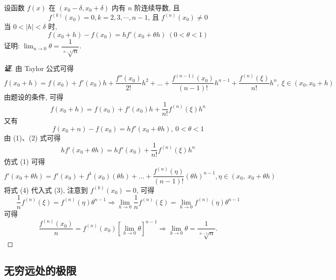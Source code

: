 \begin{example}
    设函数 $f(x)$ 在 $(x_0-\delta,x_0+\delta)$ 内有 $n$ 阶连续导数, 且
    $$f^{(k)}(x_0)=0,k=2,3,\cdots,n-1\text{, 且 }f^{(n)}(x_0)\neq 0$$
    当 $0<|h|<\delta$ 时, 
    $$f(x_0+h)  -f(x_0)  =hf'(x_{0}+\theta h)  ~ ( 0 <\theta  < 1) $$
    证明: $\displaystyle \lim _{n\to 0}\theta =\dfrac{1}{\sqrt[n-1] {n}}.$
\end{example}
\begin{proof}[{\songti \textbf{证}}]
    由 Taylor 公式可得
    $$f(x_0+h)  =f(x_0)  +f'(x_0)  h+\dfrac{f''(x_0)  }{2!}h^{2}+\ldots +\dfrac{f^{\left( n-1\right) }(x_0)  }{\left( n-1\right) !}h^{n-1}+\dfrac{f^{(n) }(\xi ) }{n!}h^{n},~\xi\in(x_0,x_0+h)$$
    由题设的条件, 可得
    \begin{equation}
        f(x_0+h)  =f(x_0)  +f'(x_0)  h+\dfrac{1}{n!}f^{(n) }(\xi ) h^{n}\tag{1}
    \end{equation}
    又有
    \begin{equation}
        f\left( x_{0}+n\right) -f(x_0)  =hf'(x_{0}+\theta h)  ,~0 <\theta  <1 \tag{2}
    \end{equation}
    由 (1)、(2) 式可得
    \begin{equation}
        hf'(x_{0}+\theta h)  =hf'(x_0)  +\dfrac{1}{n!}f^{(n) }(\xi ) h^{n}\tag{3}
    \end{equation}
    仿式 (1) 可得
    \begin{equation}
        f'(x_{0}+\theta h)  =f'(x_0)  +f^{1}(x_0)  \left( \theta h\right) +\ldots +\dfrac{f^{(n) }\left( \eta \right) }{\left( n-1\right) !}\left( \theta h\right) ^{n-1},\eta \in \left( x_{0},~x_{0}+\theta h\right) \tag{4}
    \end{equation}
    将式 (4) 代入式 (3), 注意到 $f^{(k)}(x_0)=0$, 可得
    $$\dfrac{1}{n}f^{(n)}(\xi)=f^{(n)}(\eta)\theta^{n-1}\Rightarrow \lim_{h\to0}\dfrac{1}{n}f^{(n)}(\xi)=\lim_{h\to0}f^{(n)}(\eta) \theta^{n-1}$$
    可得 $$\dfrac{f^{(n)}(x_0)}{n}=f^{(n)}(x_0)\left[\lim_{h\to0}\theta\right]^{n-1}\Rightarrow \lim_{h\to0}\theta=\dfrac{1}{\sqrt[n-1]{n}}.$$
\end{proof}

\subsection{无穷远处的极限}

